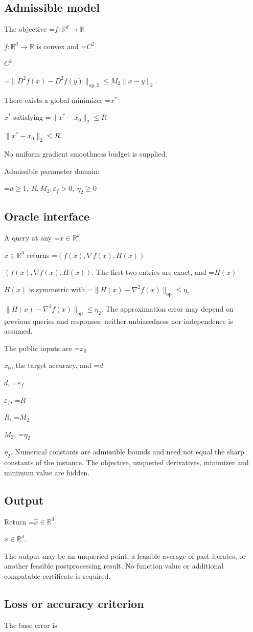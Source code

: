 \documentclass[10pt,a4paper]{article}
\newcommand{\AtlasMath}[1]{\par\begingroup\centering\setbox0=\hbox{$\displaystyle #1$}\ifdim\wd0>1.4\linewidth\typeout{ATLAS WIDE FORMULA: \the\wd0}\fi\ifdim\wd0>\linewidth\resizebox{\linewidth}{!}{\box0}\else\box0\fi\par\endgroup}
\newcommand{\AtlasInlineMath}[1]{\begingroup\setbox0=\hbox{$#1$}\ifdim\wd0>.4\linewidth\endgroup\AtlasMath{#1}\else\endgroup$#1$\fi}
\begin{document}
\subsection{Admissible model}
The objective \AtlasInlineMath{f:\mathbb{R}^d\to\mathbb{R}} is convex and \AtlasInlineMath{C^2}.


\AtlasMath{\|D^{2}f(x)-D^{2}f(y)\|_{\mathrm{op},2}\le M_2\|x-y\|_{2}.}


There exists a global minimizer \AtlasInlineMath{x^*} satisfying \AtlasInlineMath{\|x^*-x_0\|_2\le R}.

No uniform gradient smoothness budget is supplied.

Admissible parameter domain:


\AtlasMath{d\ge1,\ R,M_2,\varepsilon_f>0,\ \eta_2\ge0}


\subsection{Oracle interface}
A query at any \AtlasInlineMath{x\in\mathbb{R}^d} returns \AtlasInlineMath{(f(x),\nabla f(x),H(x))}. The first two entries are exact, and \AtlasInlineMath{H(x)} is symmetric with \AtlasInlineMath{\|H(x)-\nabla^2f(x)\|_{\mathrm{op}}\le\eta_2}. The approximation error may depend on previous queries and responses; neither unbiasedness nor independence is assumed.

The public inputs are \AtlasInlineMath{x_0}, the target accuracy, and \AtlasInlineMath{d}, \AtlasInlineMath{\varepsilon_f}, \AtlasInlineMath{R}, \AtlasInlineMath{M_2}, \AtlasInlineMath{\eta_2}. Numerical constants are admissible bounds and need not equal the sharp constants of the instance. The objective, unqueried derivatives, minimizer and minimum value are hidden.

\subsection{Output}
Return \AtlasInlineMath{\widehat{x}\in \mathbb{R}^d}.

The output may be an unqueried point, a feasible average of past iterates, or another feasible postprocessing result. No function value or additional computable certificate is required.

\subsection{Loss or accuracy criterion}
The base error is
\end{document}
